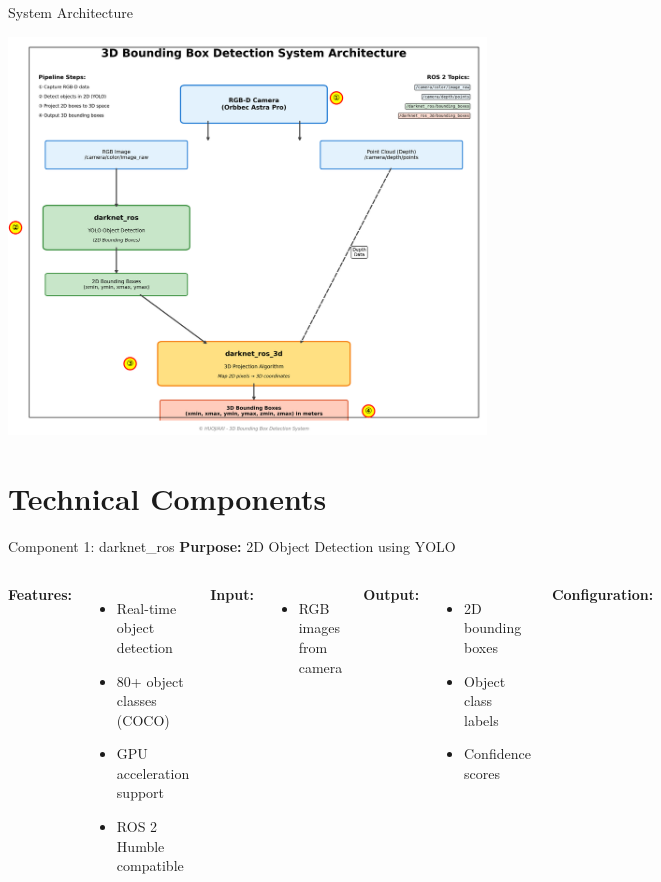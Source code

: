 \documentclass[aspectratio=169]{beamer}
\begin{document}
\begin{frame}{System Architecture}
\begin{center}
    \includegraphics[width=0.95\textwidth,height=0.8\textheight,keepaspectratio]{system_architecture.png}
\end{center}
\end{frame}

\section{Technical Components}

\begin{frame}{Component 1: darknet\_ros}
\textbf{Purpose:} 2D Object Detection using YOLO

\begin{columns}
\textbf{Features:}
\begin{itemize}
    \item Real-time object detection
    \item 80+ object classes (COCO)
    \item GPU acceleration support
    \item ROS 2 Humble compatible
\end{itemize}

\vspace{0.5em}
\textbf{Input:}
\begin{itemize}
    \item RGB images from camera
\end{itemize}

\vspace{0.5em}
\textbf{Output:}
\begin{itemize}
    \item 2D bounding boxes
    \item Object class labels
    \item Confidence scores
\end{itemize}

\textbf{Configuration:}

\end{columns}
\end{frame}
\end{document}
